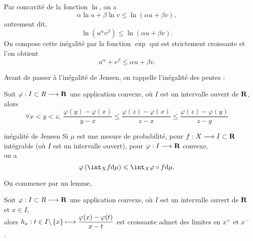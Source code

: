 \documentclass[a4paper,11pt, twoside]{article}
\begin{document}
\begin{Proof}
  Par concavité de la fonction $\ln$, on a 
  $$\alpha\ln u+\beta\ln v\leqslant\ln\left(\alpha u+\beta v\right),$$
  autrement dit, 
  $$\ln\left(u^\alpha v^\beta\right)\leqslant\ln\left(\alpha u+\beta v\right).$$
  On compose cette inégalité par la fonction $\exp$ qui est strictement croissante et l'on obtient
  $$u^\alpha+v^\beta\leqslant \alpha u+\beta v.$$
\end{Proof}

Avant de passer à l'inégalité de Jensen, on rappelle l'inégalité des pentes : 


\begin{prop}
  Soit $\varphi:I\subset R\longrightarrow\mathbf R$ une application convexe, où $I$ est un intervalle ouvert de $\mathbf R$,\\

  alors 
  $$\forall x<y<z,\ \frac{\varphi(y)-\varphi(x)}{y-x}\leqslant\frac{\varphi(z)-\varphi(x)}{z-x}\leqslant \frac{\varphi(z)-\varphi(y)}{z-y}$$
\end{prop}


\begin{propC}{inégalité de Jensen}
  Si $\mu$ est une mesure de probabilité, pour $f:X\longrightarrow I\subset \mathbf R$ intégrable (où $I$ est un intervalle ouvert), pour $\varphi:I\longrightarrow\mathbf R$ convexe,\\

  on a 
  $$\varphi\Par{\int_Xf\mathrm d\mu}\leqslant \int_X\varphi\circ f\mathrm d\mu.$$
\end{propC}


On commence par un lemme,


\begin{lemme}
  Soit $\varphi:I\subset R\longrightarrow\mathbf R$ une application convexe, où $I$ est un intervalle ouvert de $\mathbf R$ et $x\in I$,\\

  alors $h_x:t\in I\backslash\left\{x\right\}\longmapsto\displaystyle\frac{\varphi(x)-\varphi(t)}{x-t}$ est croissante admet des limites en $x^+$ et $x^-$.
\end{lemme}
\end{document}

